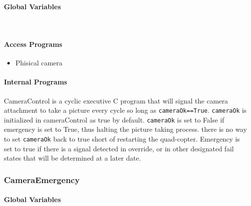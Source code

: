 \documentclass[10pt,letterpaper]{article}
\begin{document}
\paragraph{Global Variables}
~
\begin{table}[H]
  \caption{CameraControl}
\end{table}

\paragraph{Access Programs}
\begin{itemize} 
	\item Phisical camera
\end{itemize}

\paragraph{Internal Programs}
CameraControl is a cyclic executive C program that will signal the camera attachment to take a picture every cycle so long as \texttt{cameraOk==True}. \texttt{cameraOk} is initialized in 
cameraControl as true by default. \texttt{cameraOk} is set to False if emergency is set to True, thus halting the picture taking process. there is no way to set \texttt{cameraOk} back to true short of restarting the quad-copter. Emergency is set to true if there is a signal detected in override, or in other designated fail states that will be determined at a later date.





\subsubsection{CameraEmergency}

\paragraph{Global Variables}
~
\begin{table}[H]
  \caption{CameraEmergency}
\end{table}
\end{document}
